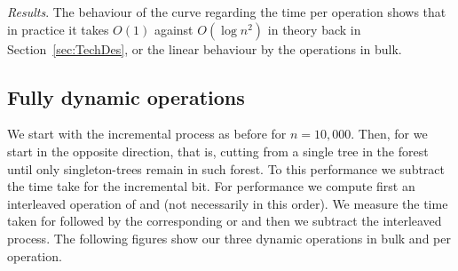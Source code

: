\textit{\emph{Results}}. The behaviour of the curve regarding the time per \link operation shows that in practice it takes $O(1)$ against $O(\log n^2)$ in theory back in Section~\ref{sec:TechDes}, or the linear behaviour by the \link operations in bulk.

\subsection{Fully dynamic operations} 
We start with the incremental process as before for $n=10,000$. Then, for \cut we start in the opposite direction, that is, cutting from a single tree in the forest until only singleton-trees remain in such forest. To this performance we subtract the time take for the incremental bit. For \conn performance we compute first an interleaved operation of \link and \cut (not necessarily in this order). We measure the time taken for \conn followed by the corresponding \link or \cut and then we subtract the interleaved process. The following figures show our three dynamic operations in bulk and per operation.

